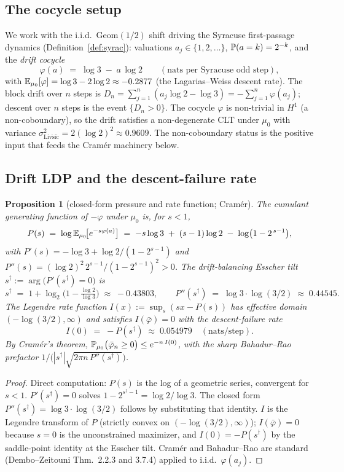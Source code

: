 \documentclass[11pt]{amsart}
\newtheorem{proposition}[theorem]{Proposition}
\theoremstyle{definition}
\theoremstyle{remark}
\begin{document}
\subsection{The cocycle setup}
We work with the i.i.d.\ Geom$(1/2)$ shift driving the Syracuse first-passage dynamics
(Definition~\ref{def:syrac}): valuations $a_j\in\{1,2,\dots\}$, $\mathbb{P}(a=k)=2^{-k}$, and the
\emph{drift cocycle}
\[
  \varphi(a)\;=\;\log 3 \;-\; a\,\log 2 \qquad(\text{nats per Syracuse odd step}),
\]
with $\mathbb{E}_{\mu_0}[\varphi]=\log 3-2\log 2\approx-0.2877$ (the Lagarias--Weiss descent rate). The
block drift over $n$ steps is $D_n=\sum_{j=1}^n(a_j\log 2-\log 3)=-\sum_{j=1}^n\varphi(a_j)$;
descent over $n$ steps is the event $\{D_n>0\}$. The cocycle $\varphi$ is non-trivial in
$H^1$ (a non-coboundary), so the drift satisfies a non-degenerate CLT under $\mu_0$ with
variance $\sigma^2_{\mathrm{Liv\check si\check c}}=2(\log 2)^2\approx 0.9609$. The non-coboundary
status is the positive input that feeds the Cram\'er machinery below.

\subsection{Drift LDP and the descent-failure rate}

\begin{proposition}[closed-form pressure and rate function; Cram\'er]\label{prop:pressure}
The cumulant generating function of $-\varphi$ under $\mu_0$ is, for $s<1$,
\[
  P(s)\;=\;\log\mathbb{E}_{\mu_0}\!\big[e^{-s\varphi(a)}\big]
       \;=\;-s\log 3\;+\;(s-1)\log 2\;-\;\log\!\big(1-2^{\,s-1}\big),
\]
with $P'(s)=-\log 3+\log 2/(1-2^{s-1})$ and $P''(s)=(\log 2)^2\,2^{s-1}/(1-2^{s-1})^2>0$. The
\emph{drift-balancing Esscher tilt} $s^\dagger:=\arg\!\big(P'(s^\dagger)=0\big)$ is
\[
  s^\dagger\;=\;1+\log_2\!\Big(1-\tfrac{\log 2}{\log 3}\Big)\;\approx\;-0.43803,
  \qquad
  P''(s^\dagger)\;=\;\log 3\cdot\log(3/2)\;\approx\;0.44545.
\]
The Legendre rate function $I(x):=\sup_s(sx-P(s))$ has effective domain $(-\log(3/2),\infty)$
and satisfies $I(\bar\varphi)=0$ with the \emph{descent-failure rate}
\[
  I(0)\;=\;-P(s^\dagger)\;\approx\;0.054979\quad(\text{nats/step}).
\]
By Cram\'er's theorem, $\mathbb{P}_{\mu_0}\big(\bar\varphi_n\ge 0\big)\le e^{-n\,I(0)}$, with the sharp
Bahadur--Rao prefactor $1/\big(|s^\dagger|\sqrt{2\pi n\,P''(s^\dagger)}\big)$.
\end{proposition}

\begin{proof}
Direct computation: $P(s)$ is the log of a geometric series, convergent for $s<1$. $P'(s^\dagger)=0$
solves $1-2^{s^\dagger-1}=\log 2/\log 3$. The closed form $P''(s^\dagger)=\log 3\cdot\log(3/2)$ follows by
substituting that identity. $I$ is the Legendre transform of $P$ (strictly convex on $(-\log(3/2),\infty)$);
$I(\bar\varphi)=0$ because $s=0$ is the unconstrained maximizer, and $I(0)=-P(s^\dagger)$ by the
saddle-point identity at the Esscher tilt. Cram\'er and Bahadur--Rao are standard
(Dembo--Zeitouni Thm.\ 2.2.3 and 3.7.4) applied to i.i.d.\ $\varphi(a_j)$.
\end{proof}
\end{document}
